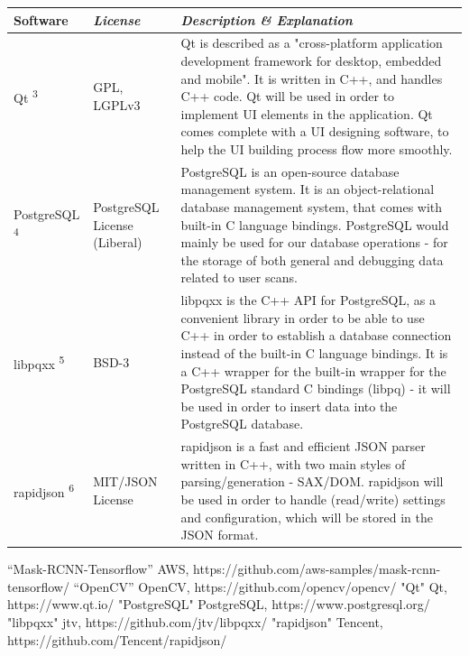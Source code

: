 \documentclass[conference]{IEEEtran}
\begin{document}
\begin{table}[htbp!]\normalsize
\begin{center}
\begin{tabular}{|p{1.5cm}|p{1.5cm}|p{4.7cm}|}
\hline
\textbf{Software} & \textbf{\textit{License}}& \textbf{\textit{Description \& Explanation}}\\
\hline
Qt \textsuperscript{3} & GPL, LGPLv3 &
Qt is described as a "cross-platform application development framework for desktop, embedded and mobile". It is written in C++, and handles C++ code. \newline\newline
Qt will be used in order to implement UI elements in the application. Qt comes complete with a UI designing software, to help the UI building process flow more smoothly.
\\ \hline
PostgreSQL \textsuperscript{4} & PostgreSQL License (Liberal) &
PostgreSQL is an open-source database management system. It is an object-relational database management system, that comes with built-in C language bindings.\newline\newline
PostgreSQL would mainly be used for our database operations - for the storage of both general and debugging data related to user scans.
\\ \hline
libpqxx \textsuperscript{5} & BSD-3 &
libpqxx is the C++ API for PostgreSQL, as a convenient library in order to be able to use C++ in order to establish a database connection instead of the built-in C language bindings.\newline\newline
It is a C++ wrapper for the built-in wrapper for the PostgreSQL standard C bindings (libpq) - it will be used in order to insert data into the PostgreSQL database.
\\ \hline
rapidjson \textsuperscript{6} & MIT/JSON License &
rapidjson is a fast and efficient JSON parser written in C++, with two main styles of parsing/generation - SAX/DOM.\newline\newline
rapidjson will be used in order to handle (read/write) settings and configuration, which will be stored in the JSON format.
\\ \hline
\end{tabular}
\label{tab1}
\end{center}
\end{table}

\begin{thebibliography}{00}
 “Mask-RCNN-Tensorflow” AWS, https://github.com/aws-samples/mask-rcnn-tensorflow/
 “OpenCV” OpenCV, https://github.com/opencv/opencv/
 "Qt" Qt, https://www.qt.io/
 "PostgreSQL" PostgreSQL, https://www.postgresql.org/
 "libpqxx" jtv, https://github.com/jtv/libpqxx/
 "rapidjson" Tencent, https://github.com/Tencent/rapidjson/
\end{thebibliography}~\\~\\
\end{document}
